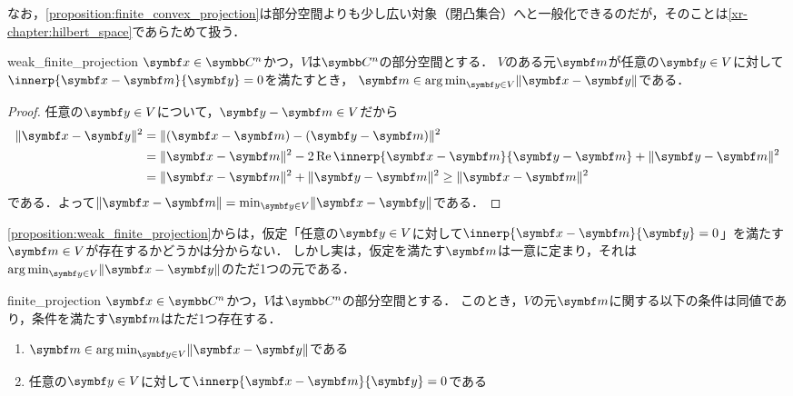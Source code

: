 \documentclass[../../main]{subfiles}
\begin{document}
なお，\cref{proposition:finite_convex_projection}は部分空間よりも少し広い対象（閉凸集合）へと一般化できるのだが，そのことは\cref{xr-chapter:hilbert_space}であらためて扱う．

\begin{proposition}{}{weak_finite_projection}
  \(\vect{x}\in\numset{C}^n\)かつ，\(V\)は\(\numset{C}^n\)の部分空間とする．
  \(V\)のある元\(\vect{m}\)が任意の\(\vect{y}\in V\)に対して\(\innerp{\vect{x}-\vect{m}}{\vect{y}}=0\)を満たすとき，
  \(\vect{m}\in\argmin_{\vect{y}\in V}\vnorm{\vect{x}-\vect{y}}\)である．
\end{proposition}

\begin{proof}
  任意の\(\vect{y}\in V\)について，\(\vect{y}-\vect{m}\in V\)だから
  \begin{align*}
    \vnorm{\vect{x}-\vect{y}}^2 &= \vnorm{(\vect{x}-\vect{m})-(\vect{y}-\vect{m})}^2 \\
    &= \vnorm{\vect{x}-\vect{m}}^2-2\rpart\innerp{\vect{x}-\vect{m}}{\vect{y}-\vect{m}}+\vnorm{\vect{y}-\vect{m}}^2 \\
    &= \vnorm{\vect{x}-\vect{m}}^2+\vnorm{\vect{y}-\vect{m}}^2 \geq \vnorm{\vect{x}-\vect{m}}^2
  \end{align*}
  である．よって\(\vnorm{\vect{x}-\vect{m}}=\min_{\vect{y}\in V}\vnorm{\vect{x}-\vect{y}}\)である．
\end{proof}

\cref{proposition:weak_finite_projection}からは，仮定「任意の\(\vect{y}\in V\)に対して\(\innerp{\vect{x}-\vect{m}}{\vect{y}}=0\)」を満たす\(\vect{m}\in V\)が存在するかどうかは分からない．
しかし実は，仮定を満たす\(\vect{m}\)は一意に定まり，それは\(\argmin_{\vect{y}\in V}\vnorm{\vect{x}-\vect{y}}\)のただ1つの元である．

\begin{proposition}{}{finite_projection}
  \(\vect{x}\in\numset{C}^n\)かつ，\(V\)は\(\numset{C}^n\)の部分空間とする．
  このとき，\(V\)の元\(\vect{m}\)に関する以下の条件は同値であり，条件を満たす\(\vect{m}\)はただ1つ存在する．
  \begin{enumerate}
    \item \(\vect{m}\in\argmin_{\vect{y}\in V}\vnorm{\vect{x}-\vect{y}}\)である
    \item 任意の\(\vect{y}\in V\)に対して\(\innerp{\vect{x}-\vect{m}}{\vect{y}}=0\)である
  \end{enumerate}
\end{proposition}
\end{document}
